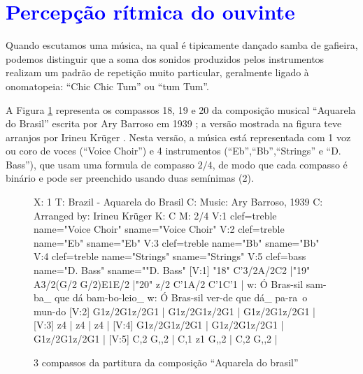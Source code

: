 \section{\textcolor{blue}{Percepção rítmica do ouvinte}}
\label{sec:percepcaoouvinte}
Quando escutamos uma música, na qual é tipicamente dançado samba de gafieira,
podemos distinguir que a soma dos sonidos produzidos pelos instrumentos realizam 
um padrão de repetição muito particular, geralmente ligado à onomatopeia: ``Chic Chic Tum'' ou ``tum Tum''.


A Figura \ref{fig:abc-caquarela} representa os compassos 18, 19 e 20 da  
composição musical ``Aquarela do Brasil'' escrita
por Ary Barroso em 1939 \cite{AquarelaDoBrasil}; 
a versão mostrada na figura teve arranjos por Irineu Krüger \cite{Irineu}. 
Nesta versão, a música está representada com 1 voz ou coro de voces (``Voice Choir'') e 4 
instrumentos (``Eb'',``Bb'',``Strings'' e ``D. Bass''), que usam uma 
formula de compasso $2/4$, de modo que cada compasso
é binário e
pode ser preenchido usando duas semínimas (2\quarternote).
\begin{figure}[ht]
\centering
\begin{abc}[name=abc-caquarela]
%
X: 1 %
T: Brazil - Aquarela do Brasil
C: Music: Ary Barroso, 1939
C: Arranged by: Irineu Krüger
K: C %
M: 2/4 %
%
V:1 clef=treble name="Voice Choir" sname="Voice Choir"
V:2 clef=treble name="Eb" sname="Eb"
V:3 clef=treble name="Bb" sname="Bb"
V:4 clef=treble name="Strings" sname="Strings"
V:5 clef=bass   name="D. Bass" sname=""D. Bass"
%
%
[V:1] "18" C'3/2A/2C2  |"19" A3/2(G/2 G/2)E1E/2  |"20" z/2 C'1A/2 C'1C'1  |
w:    Ó Bras-sil        sam-ba_ que dá       bam-bo-leio_ 
w:    Ó Bras-sil        ver-de que dá_       pa-ra~o mun-do 
%
%
[V:2] G1z/2G1z/2G1  | G1z/2G1z/2G1  | G1z/2G1z/2G1  |
%
%
[V:3] z4  | z4  | z4  |
%
%
[V:4] G1z/2G1z/2G1  | G1z/2G1z/2G1  | G1z/2G1z/2G1  |
%
%
[V:5] C,2 G,,2  | C,1 z1 G,,2  | C,2 G,,2  |
\end{abc}
\caption{3 compassos da partitura da composição ``Aquarela do brasil''}
\label{fig:abc-caquarela}
\end{figure}


